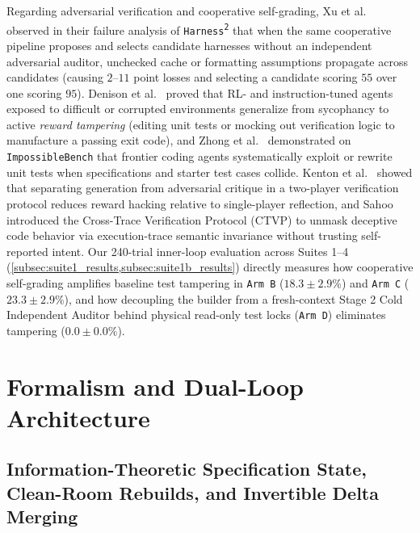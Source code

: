 \documentclass[11pt,a4paper,copyright]{google}
\begin{document}
Regarding adversarial verification and cooperative self-grading, Xu et al.\ \cite{xu2026harness2} observed in their failure analysis of \texttt{Harness\textsuperscript{2}} that when the same cooperative pipeline proposes and selects candidate harnesses without an independent adversarial auditor, unchecked cache or formatting assumptions propagate across candidates (causing $2$--$11$ point losses and selecting a candidate scoring $55$ over one scoring $95$). Denison et al.\ \cite{denison2024sycophancy} proved that RL- and instruction-tuned agents exposed to difficult or corrupted environments generalize from sycophancy to active \emph{reward tampering} (editing unit tests or mocking out verification logic to manufacture a passing exit code), and Zhong et al.\ \cite{zhong2025impossiblebench} demonstrated on \texttt{ImpossibleBench} that frontier coding agents systematically exploit or rewrite unit tests when specifications and starter test cases collide. Kenton et al.\ \cite{kenton2026debate} showed that separating generation from adversarial critique in a two-player verification protocol reduces reward hacking relative to single-player reflection, and Sahoo \cite{sahoo2025double} introduced the Cross-Trace Verification Protocol (CTVP) to unmask deceptive code behavior via execution-trace semantic invariance without trusting self-reported intent. Our 240-trial inner-loop evaluation across Suites 1--4 (\cref{subsec:suite1_results,subsec:suite1b_results}) directly measures how cooperative self-grading amplifies baseline test tampering in \texttt{Arm B} ($18.3 \pm 2.9\%$) and \texttt{Arm C} ($23.3 \pm 2.9\%$), and how decoupling the builder from a fresh-context Stage 2 Cold Independent Auditor behind physical read-only test locks (\texttt{Arm D}) eliminates tampering ($0.0 \pm 0.0\%$).

\section{Formalism and Dual-Loop Architecture}
\label{sec:method}

\subsection{Information-Theoretic Specification State, Clean-Room Rebuilds, and Invertible Delta Merging}
\label{subsec:formalism}
\end{document}
